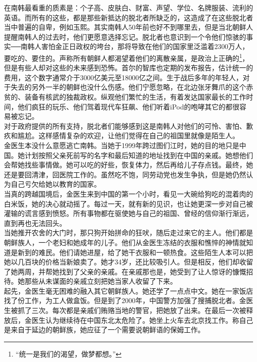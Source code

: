\ifnum{}
	\begin{multicols}{\theparacolNo}
\fi
在南韩最看重的质素是：个子高、皮肤白、财富、声望、学位、名牌服装、流利的英语。而所有的这些，都是那些新抵达的脱北者所缺乏的，这造成了在这些脱北者当中普遍的自卑，例如玉熙。其实南韩人50年前也好不到哪里去，但是当北朝鲜人提醒南韩人的过去时，他们更愿意选择忘记。脱北者也意识到一个令他们惊骇的事实──南韩人害怕金正日政权的垮台，那将导致在他们的国家里泛滥着2300万人，要吃的、要住的。声称所有朝鲜人都渴望着他们的离散亲属，是政治上正确的\footnote{“统一是我们的渴望，做梦都想。”}，但是有些人却对这些的未来感到恐怖。首尔的智库也定期的发布报告，估计统一的费用，这个数字通常介于3000亿美元至18000亿之间。生于战后多年的年轻人，对于失去的另外一半的朝鲜也没什么伤感。他们宁愿忽略，在北边张牙舞爪的这个赤贫的、装备有核武的独裁政权。纵观他们繁忙的生活，有着发达国家最长的工作时间，他们疯狂的玩乐、他们驾着现代车狂飙、他们听着iPod的咆哮其它的都很容易被忘记。\\

对于政府提供的所有支持，脱北者们能够感到这是南韩人对他们的可怜、害怕、歉疚和尴尬。这样感情复杂的欢迎，让他们觉得在自己的祖国里就像是陌生人。\\

金医生本没什么意愿逃亡南韩。当她于1999年跨过图们江时，她的目的地只是中国。她计划按照父亲死前写的名字和最后知道的地址找到在中国的亲戚。她想他们会帮她找些事情做。她可以吃的好些，恢复体力，然后再给儿子存点钱。最终，她还是要回清津，回医院工作的。虽然吃不饱，同劳动党也发生争执，但是她仍然认为自己亏欠给她以教育的国家。\\

当真的跨越国境后，金医生来到中国的第一个小时，看见一大碗给狗吃的混着肉的白米饭，她的决心就动摇了。每过一天，就有新的见识，也让她更深一步对自己被灌输的谎言感到愤怒。所有事物都在驱使她与自己的祖国、曾经的信仰渐行渐远，直到再也无法回头。\\

当她推开农舍的大门时，那只狗开始拼命的狂吠，随后走过来它的主人。他们都是朝鲜族人，一个老妇和她成年的儿子。他们从金医生冻结的衣服和憔悴的神情就知道是新到的难民。他们请她进屋，给了她干衣服和一顿热食。这些陌生人本可以把她以几百块的价格当新娘卖了。她才34岁，还比较吸引人。但是相反，他们却收留了她两周，并帮她找到了父亲的亲戚。在亲戚那也是，她受到了让人惊讶的慷慨招待。她那些从未谋面的亲戚立刻把她当家人收留了下来。\\

起先，金医生毫无困难的融入其它朝鲜族人。她还学了一点点中文。她在一家饭店找了份工作，为工人做盒饭。但是到了2000年，中国警方加强了搜捕脱北者。金医生被抓了三次。每次都是亲戚们贿赂当地的警官，把她放了出来。在最后一次被释放后，金医生认为继续待在中国东北太危险了。她坐上火车去北京找工作。称自己是来自于延边的朝鲜族，她应征了一个需要说朝鲜语的保姆工作。\\


\end{multicols}
